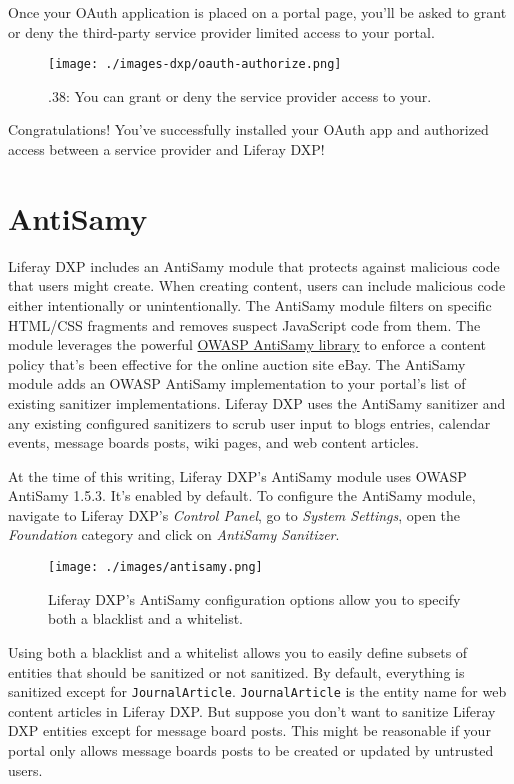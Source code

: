 Once your OAuth application is placed on a portal page, you'll be asked
to grant or deny the third-party service provider limited access to your
portal.

\begin{figure}
\centering
\texttt{[image: ./images-dxp/oauth-authorize.png]}
\caption{.38: You can grant or deny the service provider access to
your.}
\end{figure}

Congratulations! You've successfully installed your OAuth app and
authorized access between a service provider and Liferay DXP!

\section{AntiSamy}\label{antisamy}

Liferay DXP includes an AntiSamy module that protects against malicious
code that users might create. When creating content, users can include
malicious code either intentionally or unintentionally. The AntiSamy
module filters on specific HTML/CSS fragments and removes suspect
JavaScript code from them. The module leverages the powerful
\href{https://www.owasp.org/index.php/Category:OWASP_AntiSamy_Project}{OWASP
AntiSamy library} to enforce a content policy that's been effective for
the online auction site eBay. The AntiSamy module adds an OWASP AntiSamy
implementation to your portal's list of existing sanitizer
implementations. Liferay DXP uses the AntiSamy sanitizer and any
existing configured sanitizers to scrub user input to blogs entries,
calendar events, message boards posts, wiki pages, and web content
articles.

At the time of this writing, Liferay DXP's AntiSamy module uses OWASP
AntiSamy 1.5.3. It's enabled by default. To configure the AntiSamy
module, navigate to Liferay DXP's \emph{Control Panel}, go to
\emph{System Settings}, open the \emph{Foundation} category and click on
\emph{AntiSamy Sanitizer}.

\begin{figure}
\centering
\texttt{[image: ./images/antisamy.png]}
\caption{Liferay DXP's AntiSamy configuration options allow you to
specify both a blacklist and a whitelist.}
\end{figure}

Using both a blacklist and a whitelist allows you to easily define
subsets of entities that should be sanitized or not sanitized. By
default, everything is sanitized except for \texttt{JournalArticle}.
\texttt{JournalArticle} is the entity name for web content articles in
Liferay DXP. But suppose you don't want to sanitize Liferay DXP entities
except for message board posts. This might be reasonable if your portal
only allows message boards posts to be created or updated by untrusted
users.

